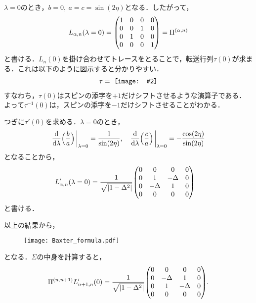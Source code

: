\documentclass[dvipdfmx,9pt]{beamer}
\newcommand\Includegraphics[2][]{\vcenter{\hbox{\texttt{[image: \#2]}}}}
\numberwithin{equation}{section}
\begin{document}
\begin{frame}{}
    $\lambda = 0$のとき，$b = 0,~ a = c = \sin(2\eta)$となる．したがって，
    \begin{align}
          L_{\alpha,n}(\lambda = 0)
        = \mqty(
            1&0&0&0\\
            0&0&1&0\\
            0&1&0&0\\
            0&0&0&1
        )
        = \Pi^{(\alpha,n)}
    \end{align}
    と書ける．$L_n(0)$を掛け合わせてトレースをとることで，転送行列$\tau(0)$が求まる．これは以下のように図示すると分かりやすい．
    \begin{align}
        \tau = ~
        \Includegraphics[scale = 0.4, trim = 0 0 0 0.3cm]{tau.pdf}
    \end{align}
    すなわち，$\tau(0)$はスピンの添字を$+1$だけシフトさせるような演算子である．
    よって$\tau^{-1}(0)$は，スピンの添字を$-1$だけシフトさせることがわかる．
\end{frame}

\begin{frame}
    つぎに$\tau'(0)$を求める．$\lambda=0$のとき，
    \begin{align}
        \dv{\lambda}\qty\Big(\frac{b}{a})\eval_{\lambda=0} = \frac{1}{\sin(2\eta)},
        \quad
        \dv{\lambda}\qty\Big(\frac{c}{a})\eval_{\lambda=0} = -\frac{\cos(2\eta)}{\sin(2\eta)}
    \end{align}
    となることから，
    \begin{align}
          L_{\alpha,n}'(\lambda = 0) &= \frac{1}{\sqrt{|1-\Delta^2|}}\mqty(
            0&0&0&0\\
            0&1&-\Delta&0\\
            0&-\Delta&1&0\\
            0&0&0&0
        )
    \end{align}
    と書ける．
\end{frame}

\begin{frame}{}
    以上の結果から，
    \begin{figure}[H]
        \centering
        \texttt{[image: Baxter\_formula.pdf]}
    \end{figure}
    となる．$\Sigma$の中身を計算すると，
    \begin{align}
        \Pi^{(n,n+1)}  L_{n+1,n}'(0)
        = \frac{1}{\sqrt{|1-\Delta^2|}}\mqty(
            0&0&0&0\\
            0&-\Delta&1&0\\
            0&1&-\Delta&0\\
            0&0&0&0
        ).
        \label{XXZ model: interaction}
    \end{align}
\end{frame}
\end{document}
